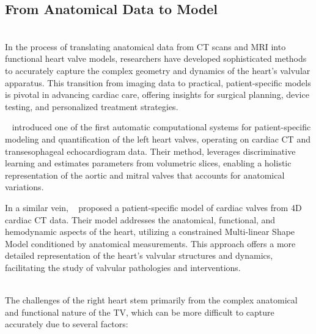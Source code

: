\subsection{From Anatomical Data to Model}
\\
In the process of translating anatomical data from \gls{CT} scans and \gls{MRI} into functional heart valve models, researchers have developed sophisticated methods to accurately capture the complex geometry and dynamics of the heart's valvular apparatus. This transition from imaging data to practical, patient-specific models is pivotal in advancing cardiac care, offering insights for surgical planning, device testing, and personalized treatment strategies.

~ introduced one of the first automatic computational systems for patient-specific modeling and quantification of the left heart valves, operating on cardiac \gls{CT} and transesophageal echocardiogram data. Their method, leverages discriminative learning and estimates  parameters from volumetric slices, enabling a holistic representation of the aortic and mitral valves that accounts for anatomical variations.

In a similar vein, ~ proposed a patient-specific model of cardiac valves from 4D cardiac \gls{CT} data. Their model addresses the anatomical, functional, and hemodynamic aspects of the heart, utilizing a constrained Multi-linear Shape Model conditioned by anatomical measurements. This approach offers a more detailed representation of the heart's valvular structures and dynamics, facilitating the study of valvular pathologies and interventions.

\\
The challenges of the right heart stem primarily from the complex anatomical and functional nature of the \gls{TV}, which can be more difficult to capture accurately due to several factors:

